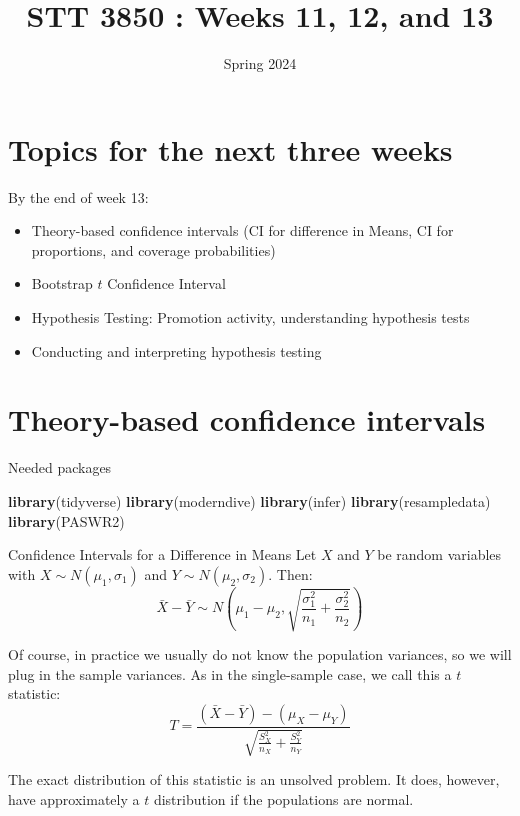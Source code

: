 \documentclass[
  ignorenonframetext,
]{beamer}
\title{STT 3850 : Weeks 11, 12, and 13}
\author{Spring 2024}
\date{}
\institute{Appalachian State University}
\newenvironment{Shaded}{\begin{snugshade}}{\end{snugshade}}
\newcommand{\FunctionTok}[1]{\textcolor[rgb]{0.13,0.29,0.53}{\textbf{#1}}}
\newcommand{\NormalTok}[1]{#1}
\providecommand{\tightlist}{%
  \setlength{\itemsep}{0pt}\setlength{\parskip}{0pt}}
\begin{document}
\frame{\titlepage}

\hypertarget{topics-for-the-next-three-weeks}{%
\section{Topics for the next three
weeks}\label{topics-for-the-next-three-weeks}}

\begin{frame}{By the end of week 13:}
\protect\hypertarget{by-the-end-of-week-13}{}
\begin{itemize}
\tightlist
\item
  Theory-based confidence intervals (CI for difference in Means, CI for
  proportions, and coverage probabilities)
\item
  Bootstrap \(t\) Confidence Interval
\item
  Hypothesis Testing: Promotion activity, understanding hypothesis tests
\item
  Conducting and interpreting hypothesis testing
\end{itemize}
\end{frame}

\hypertarget{theory-based-confidence-intervals}{%
\section{Theory-based confidence
intervals}\label{theory-based-confidence-intervals}}

\begin{frame}[fragile]{Needed packages}
\protect\hypertarget{needed-packages}{}
\begin{Shaded}
\begin{Highlighting}[]
\FunctionTok{library}\NormalTok{(tidyverse)}
\FunctionTok{library}\NormalTok{(moderndive)}
\FunctionTok{library}\NormalTok{(infer)}
\FunctionTok{library}\NormalTok{(resampledata)}
\FunctionTok{library}\NormalTok{(PASWR2)}
\end{Highlighting}
\end{Shaded}
\end{frame}

\begin{frame}{Confidence Intervals for a Difference in Means}
\protect\hypertarget{confidence-intervals-for-a-difference-in-means}{}
Let \(X\) and \(Y\) be random variables with
\(X\sim N(\mu_1, \sigma_1)\) and \(Y\sim N(\mu_2, \sigma_2)\). Then:
\[\bar{X}-\bar{Y}\sim N\left(\mu_1-\mu_2, \sqrt{\frac{\sigma_1^2}{n_1}+\frac{\sigma_2^2}{n_2}}\right)\]

Of course, in practice we usually do not know the population variances,
so we will plug in the sample variances. As in the single-sample case,
we call this a \(t\) statistic:
\[T=\frac{(\bar{X}-\bar{Y})-(\mu_X-\mu_Y)}{\sqrt{\frac{S^2_X}{n_X}+\frac{S^2_Y}{n_Y}}}\]

The exact distribution of this statistic is an unsolved problem. It
does, however, have approximately a \(t\) distribution if the
populations are normal.
\end{frame}
\end{document}
